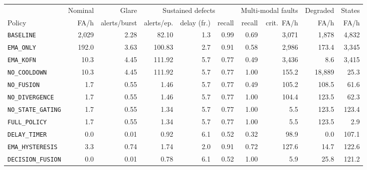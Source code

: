 \begin{tabular}{@{}lrrrrrrrrr@{}}
\toprule
 & Nominal & Glare & \multicolumn{3}{c}{Sustained defects} & \multicolumn{2}{c}{Multi-modal faults} & Degraded & States \\
\cmidrule(lr){4-6}\cmidrule(lr){7-8}
Policy & FA/h & alerts/burst & alerts/ep. & delay (fr.) & recall & recall & crit.\ FA/h & FA/h & FA/h \\
\midrule
\texttt{BASELINE} & 2{,}029 & 2.28 & 82.10 & 1.3 & 0.99 & 0.69 & 3{,}071 & 1{,}878 & 4{,}832 \\
\texttt{EMA\_ONLY} & 192.0 & 3.63 & 100.83 & 2.7 & 0.91 & 0.58 & 2{,}986 & 173.4 & 3{,}345 \\
\texttt{EMA\_KOFN} & 10.3 & 4.45 & 111.92 & 5.7 & 0.77 & 0.49 & 3{,}436 & 8.6 & 3{,}415 \\
\texttt{NO\_COOLDOWN} & 10.3 & 4.45 & 111.92 & 5.7 & 0.77 & 1.00 & 155.2 & 18{,}889 & 25.3 \\
\texttt{NO\_FUSION} & 1.7 & 0.55 & 1.46 & 5.7 & 0.77 & 0.49 & 105.2 & 108.5 & 61.6 \\
\texttt{NO\_DIVERGENCE} & 1.7 & 0.55 & 1.46 & 5.7 & 0.77 & 1.00 & 104.4 & 123.5 & 62.3 \\
\texttt{NO\_STATE\_GATING} & 1.7 & 0.55 & 1.34 & 5.7 & 0.77 & 1.00 & 5.5 & 123.5 & 123.4 \\
\texttt{FULL\_POLICY} & 1.7 & 0.55 & 1.34 & 5.7 & 0.77 & 1.00 & 5.5 & 123.5 & 2.9 \\
\midrule
\texttt{DELAY\_TIMER} & 0.0 & 0.01 & 0.92 & 6.1 & 0.52 & 0.32 & 98.9 & 0.0 & 107.1 \\
\texttt{EMA\_HYSTERESIS} & 3.3 & 0.74 & 1.74 & 2.0 & 0.91 & 0.72 & 127.6 & 14.7 & 122.6 \\
\texttt{DECISION\_FUSION} & 0.0 & 0.01 & 0.78 & 6.1 & 0.52 & 1.00 & 5.9 & 25.8 & 121.2 \\
\bottomrule
\end{tabular}
